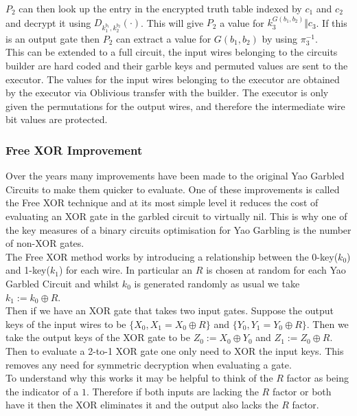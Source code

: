 \documentclass[ %
                    author={Nicholas Tutte},
                supervisor={Prof. Nigel Smart},
                    degree={MEng},
                     title={Secure Two Party Computation},
                  subtitle={A practical comparison of recent protocols},
                      type={Research - GG1K},
                      year={2015} ]{dissertation}
\begin{document}
			$P_2$ can then look up the entry in the encrypted truth table indexed by $c_1$ and $c_2$ and decrypt it using $D_{k_1^{b_1}, k_2^{b_2}}(\cdot)$. This will give $P_2$ a value for $k_3^{G(b_1, b_2)} \Vert c_3$. If this is an output gate then $P_2$ can extract a value for $G(b_1, b_2)$ by using $\pi_3^{-1}$.\\

			This can be extended to a full circuit, the input wires belonging to the circuits builder are hard coded and their garble keys and permuted values are sent to the executor. The values for the input wires belonging to the executor are obtained by the executor via Oblivious transfer with the builder. The executor is only given the permutations for the output wires, and therefore the intermediate wire bit values are protected.

			\subsubsection{Free XOR Improvement}

				Over the years many improvements have been made to the original Yao Garbled Circuits to make them quicker to evaluate. One of these improvements is called the Free XOR technique and at its most simple level it reduces the cost of evaluating an XOR gate in the garbled circuit to virtually nil. This is why one of the key measures of a binary circuits optimisation for Yao Garbling is the number of non-XOR gates.\\

				The Free XOR method works by introducing a relationship between the 0-key($k_0$) and 1-key($k_1$) for each wire. In particular an $R$ is chosen at random for each Yao Garbled Circuit and whilst $k_0$ is generated randomly as usual we take $k_1 := k_0 \oplus R$.\\

				Then if we have an XOR gate that takes two input gates. Suppose the output keys of the input wires to be $\{X_0, X_1 = X_0 \oplus R\}$ and $\{Y_0, Y_1 = Y_0 \oplus R\}$. Then we take the output keys of the XOR gate to be $Z_0 := X_0 \oplus Y_0$ and $Z_1 := Z_0 \oplus R$.\\

				Then to evaluate a 2-to-1 XOR gate one only need to XOR the input keys. This removes any need for symmetric decryption when evaluating a gate.\\

				To understand why this works it may be helpful to think of the $R$ factor as being the indicator of a $1$. Therefore if both inputs are lacking the $R$ factor or both have it then the XOR eliminates it and the output also lacks the $R$ factor.\\
\end{document}
